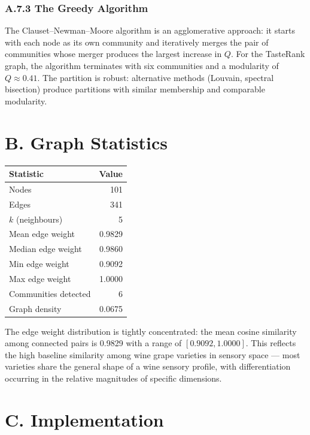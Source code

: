 \documentclass[11pt]{article}
\begin{document}
\subsubsection*{A.7.3 The Greedy Algorithm}
The Clauset--Newman--Moore algorithm is an agglomerative approach: it starts with each node as its own community and iteratively merges the pair of communities whose merger produces the largest increase in $Q$. For the TasteRank graph, the algorithm terminates with six communities and a modularity of $Q \approx 0.41$. The partition is robust: alternative methods (Louvain, spectral bisection) produce partitions with similar membership and comparable modularity.

\section*{B. Graph Statistics}

\begin{center}
\begin{tabular}{@{}lr@{}}
\toprule
Statistic & Value \\
\midrule
Nodes                 & 101 \\
Edges                 & 341 \\
$k$ (neighbours)      & 5 \\
Mean edge weight      & 0.9829 \\
Median edge weight    & 0.9860 \\
Min edge weight       & 0.9092 \\
Max edge weight       & 1.0000 \\
Communities detected  & 6 \\
Graph density         & 0.0675 \\
\bottomrule
\end{tabular}
\end{center}

The edge weight distribution is tightly concentrated: the mean cosine similarity among connected pairs is 0.9829 with a range of $[0.9092, 1.0000]$. This reflects the high baseline similarity among wine grape varieties in sensory space --- most varieties share the general shape of a wine sensory profile, with differentiation occurring in the relative magnitudes of specific dimensions.

\section*{C. Implementation}
\end{document}
